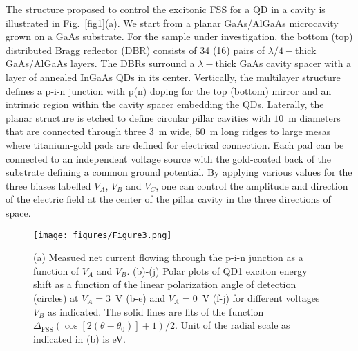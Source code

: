 \documentclass[article,twocolumn, superscriptaddress, 10pt, nofootinbib]{revtex4-1}%
\begin{document}
The structure proposed to control the excitonic FSS for a QD in a cavity is illustrated in Fig.~\ref{fig1}(a). We start from a planar GaAs/AlGaAs microcavity {grown} on a GaAs substrate. For the sample under investigation, the bottom (top) distributed Bragg reflector (DBR) consists of 34 (16) pairs of $\lambda/4-$thick GaAs/AlGaAs layers. The DBRs surround a $\lambda-$thick GaAs cavity spacer with a layer of annealed InGaAs QDs in its center. Vertically, the multilayer structure defines a p-i-n junction with p(n) doping for the top (bottom) mirror and an intrinsic region within the cavity spacer embedding the QDs. Laterally, the  planar structure is etched to define circular pillar cavities with $10$~\textmu m diameters that are  connected through three $3$~\textmu m wide, $50$~\textmu m long ridges to large mesas where titanium-gold  pads are defined for electrical connection. Each pad can be connected to an independent voltage source with the gold-coated back of the substrate defining a common ground potential. By applying various values for the three biases labelled $V_A$, $V_B$ and $V_C$, one can control the amplitude and direction of the electric field at the center of the pillar cavity in the three directions of space. \\



\begin{figure*}
    \texttt{[image: figures/Figure3.png]}
    \caption{ (a) Measued net current flowing through the p-i-n junction as a function of $V_A$ and $V_B$. (b)-(j) Polar plots of QD1 exciton energy shift as a function of the linear polarization angle of detection (circles) at $V_A=3$~V (b-e) and $V_A=0$~V (f-j) for different voltages $V_B$ as indicated. The solid lines are  fits of the function $\Delta_\text{FSS}( \cos[2(\theta-\theta_0)]+1)/2$. Unit of the radial scale as indicated in (b) is \textmu eV.}
    \label{fig3b}
\end{figure*}
\end{document}
